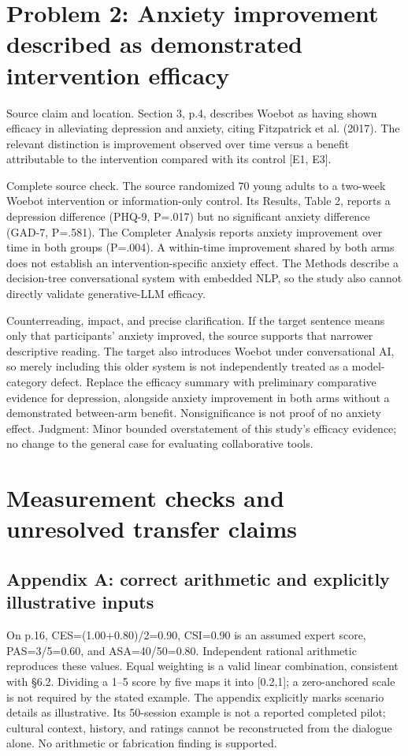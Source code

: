 \documentclass[10pt]{article}
\begin{document}
\section*{Problem 2: Anxiety improvement described as demonstrated intervention efficacy}
Source claim and location. Section 3, p.4, describes Woebot as having shown efficacy in alleviating depression and anxiety, citing Fitzpatrick et al. (2017). The relevant distinction is improvement observed over time versus a benefit attributable to the intervention compared with its control [E1, E3].\par
Complete source check. The source randomized 70 young adults to a two-week Woebot intervention or information-only control. Its Results, Table 2, reports a depression difference (PHQ-9, P=.017) but no significant anxiety difference (GAD-7, P=.581). The Completer Analysis reports anxiety improvement over time in both groups (P=.004). A within-time improvement shared by both arms does not establish an intervention-specific anxiety effect. The Methods describe a decision-tree conversational system with embedded NLP, so the study also cannot directly validate generative-LLM efficacy.\par
Counterreading, impact, and precise clarification. If the target sentence means only that participants’ anxiety improved, the source supports that narrower descriptive reading. The target also introduces Woebot under conversational AI, so merely including this older system is not independently treated as a model-category defect. Replace the efficacy summary with preliminary comparative evidence for depression, alongside anxiety improvement in both arms without a demonstrated between-arm benefit. Nonsignificance is not proof of no anxiety effect. Judgment: Minor bounded overstatement of this study’s efficacy evidence; no change to the general case for evaluating collaborative tools.\par
\section*{Measurement checks and unresolved transfer claims}
\subsection*{Appendix A: correct arithmetic and explicitly illustrative inputs}
On p.16, CES=(1.00+0.80)/2=0.90, CSI=0.90 is an assumed expert score, PAS=3/5=0.60, and ASA=40/50=0.80. Independent rational arithmetic reproduces these values. Equal weighting is a valid linear combination, consistent with §6.2. Dividing a 1–5 score by five maps it into [0.2,1]; a zero-anchored scale is not required by the stated example. The appendix explicitly marks scenario details as illustrative. Its 50-session example is not a reported completed pilot; cultural context, history, and ratings cannot be reconstructed from the dialogue alone. No arithmetic or fabrication finding is supported.\par
\end{document}
